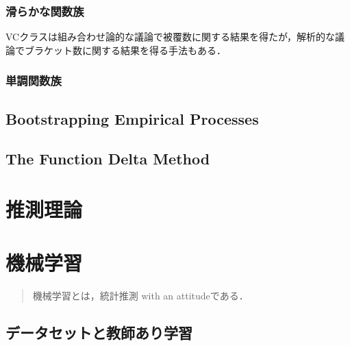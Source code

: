 \documentclass[uplatex,dvipdfmx]{jsreport}
\begin{document}
\subsection{滑らかな関数族}

\begin{tcolorbox}[colframe=ForestGreen, colback=ForestGreen!10!white,breakable,colbacktitle=ForestGreen!40!white,coltitle=black,fonttitle=\bfseries\sffamily,
title=]
    VCクラスは組み合わせ論的な議論で被覆数に関する結果を得たが，解析的な議論でブラケット数に関する結果を得る手法もある．
\end{tcolorbox}

\subsection{単調関数族}

\section{Bootstrapping Empirical Processes}

\section{The Function Delta Method}

\chapter{推測理論}

\begin{quotation}
    
\end{quotation}

\chapter{機械学習}

\begin{quotation}
    機械学習とは，統計推測 with an attitudeである．
\end{quotation}

\section{データセットと教師あり学習}
\end{document}
